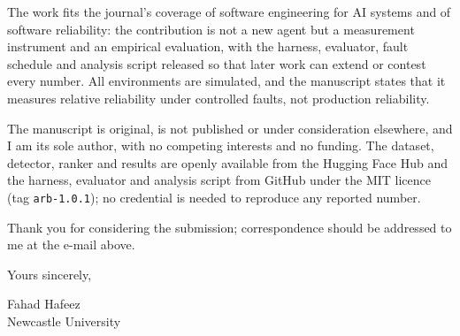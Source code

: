 \documentclass[11pt]{article}
\begin{document}
The work fits the journal's coverage of software engineering for AI systems and of software
reliability: the contribution is not a new agent but a measurement instrument and an empirical
evaluation, with the harness, evaluator, fault schedule and analysis script released so that
later work can extend or contest every number. All environments are simulated, and the
manuscript states that it measures relative reliability under controlled faults, not production
reliability.

The manuscript is original, is not published or under consideration elsewhere, and I am its sole
author, with no competing interests and no funding. The dataset, detector, ranker and results are
openly available from the Hugging Face Hub and the harness, evaluator and analysis script from
GitHub under the MIT licence (tag \texttt{arb-1.0.1}); no credential is needed to reproduce any
reported number.

Thank you for considering the submission; correspondence should be addressed to me at the e-mail
above.

Yours sincerely,

\vspace{1.2em}
Fahad Hafeez\\
Newcastle University
\end{document}
